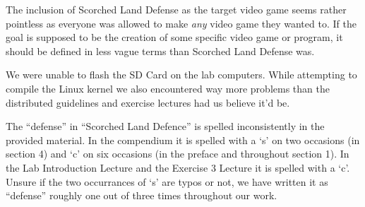 The inclusion of Scorched Land Defense as the target video game seems rather pointless as everyone was allowed to make \textit{any} video game they wanted to.
If the goal is supposed to be the creation of some specific video game or program, it should be defined in less vague terms than Scorched Land Defense was.


We were unable to flash the SD Card on the lab computers.
While attempting to compile the Linux kernel we also encountered way more problems than the distributed guidelines and exercise lectures had us believe it'd be.


The ``defense'' in ``Scorched Land Defence'' is spelled inconsistently in the provided material.
In the compendium it is spelled with a `s' on two occasions (in section 4) and `c' on six occasions (in the preface and throughout section 1).
In the Lab Introduction Lecture and the Exercise 3 Lecture it is spelled with a `c'.
Unsure if the two occurrances of `s' are typos or not, we have written it as ``defense'' roughly one out of three times throughout our work.